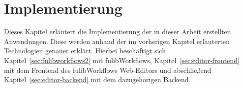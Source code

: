 \chapter{Implementierung}\label{ch:implementierung}
Dieses Kapitel erläutert die Implementierung der in dieser Arbeit erstellten Anwendungen.
Diese werden anhand der im vorherigen Kapitel erläuterten Technologien genauer erklärt.
Hierbei beschäftigt sich Kapitel~\ref{sec:fulibworkflows2} mit fulibWorkflows, Kapitel~\ref{sec:editor-frontend} mit dem Frontend des
fulibWorkflows Web-Editors und abschließend Kapitel~\ref{sec:editor-backend} mit dem dazugehörigen Backend.






